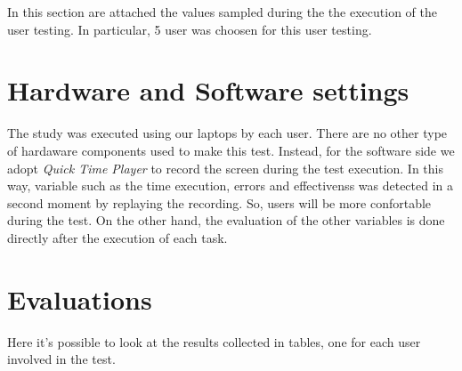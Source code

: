 In this section are attached the values sampled during the the execution of the user testing. In particular, 5 user was choosen for this user testing.

\section{Hardware and Software settings}
The study was executed using our laptops by each user. There are no other type of hardaware components used to make this test.
Instead, for the software side we adopt \textit{Quick Time Player} to record the screen during the test execution. In this way, variable such as the time execution, errors and effectivenss was detected in a second moment by replaying the recording. So, users will be more confortable during the test. On the other hand, the evaluation of the other variables is done directly after the execution of each task.

\section{Evaluations}
Here it's possible to look at the results collected in tables, one for each user involved in the test.


